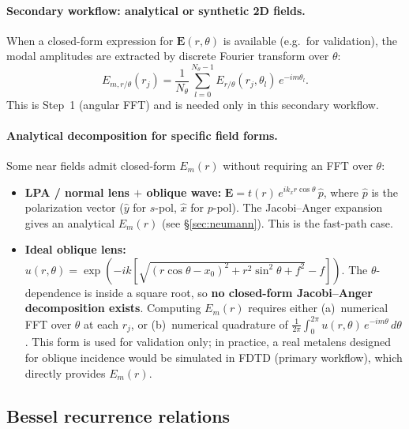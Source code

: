 \documentclass[11pt,a4paper]{article}
\newcommand{\xhat}{\hat{x}}
\newcommand{\yhat}{\hat{y}}
\newcommand{\E}{\mathbf{E}}
\begin{document}
\paragraph{Secondary workflow: analytical or synthetic 2D fields.}
When a closed-form expression for $\E(r,\theta)$ is available (e.g.\ for validation),
the modal amplitudes are extracted by discrete Fourier transform over $\theta$:
\begin{equation}
  E_{m,r/\theta}(r_j)
  = \frac{1}{N_\theta}\sum_{l=0}^{N_\theta-1}
    E_{r/\theta}(r_j,\theta_l)\,e^{-im\theta_l}.
\end{equation}
This is Step~1 (angular FFT) and is needed only in this secondary workflow.

\paragraph{Analytical decomposition for specific field forms.}
Some near fields admit closed-form $E_m(r)$ without requiring an FFT over $\theta$:

\begin{itemize}[nosep]
  \item \textbf{LPA / normal lens $+$ oblique wave:}
    $\E = t(r)\,e^{ik_x r\cos\theta}\,\hat p$, where $\hat p$ is the
    polarization vector ($\yhat$ for $s$-pol, $\xhat$ for $p$-pol).
    The Jacobi--Anger expansion gives an analytical $E_m(r)$
    (see \S\ref{sec:neumann}).  This is the fast-path case.

  \item \textbf{Ideal oblique lens:}
    $u(r,\theta) = \exp(-ik[\sqrt{(r\cos\theta-x_0)^2 + r^2\sin^2\theta + f^2} - f])$.
    The $\theta$-dependence is inside a square root, so \textbf{no closed-form
    Jacobi--Anger decomposition exists}.  Computing $E_m(r)$ requires either
    (a)~numerical FFT over $\theta$ at each $r_j$, or
    (b)~numerical quadrature of $\frac{1}{2\pi}\int_0^{2\pi} u(r,\theta)\,e^{-im\theta}\,d\theta$.
    This form is used for validation only; in practice, a real metalens designed
    for oblique incidence would be simulated in FDTD (primary workflow), which
    directly provides $E_m(r)$.
\end{itemize}

\subsection{Bessel recurrence relations}
\end{document}
